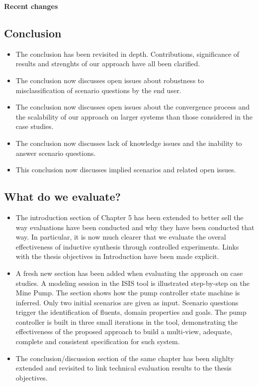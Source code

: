 \begin{center}
\textbf{\Large Recent changes}
\end{center}

\subsection*{Conclusion}

\begin{itemize}
\item The conclusion has been revisited in depth. Contributions, significance of 
      results and strenghts of our approach have all been clarified.
\item The conclusion now discusses open issues about robustness to
      misclassification of scenario questions by the end user.
\item The conclusion now discusses open issues about the convergence process and 
      the scalability of our approach on larger systems than those considered in
      the case studies.
\item The conclusion now discusses lack of knowledge issues and the inability to 
      answer scenario questions.
\item This conclusion now discusses implied scenarios and related open issues.
\end{itemize}

\subsection*{What do we evaluate?}

\begin{itemize}
\item The introduction section of Chapter 5 has been extended to better sell the 
    way evaluations have been conducted and why they have been conducted that 
    way. In particular, it is now much clearer that we evaluate the overal 
    effectiveness of inductive synthesis through controlled experiments. 
    Links with the thesis objectives in Introduction have been made explicit.
\item A fresh new section has been added when evaluating the approach on case 
    studies. A modeling session in the ISIS tool is illustrated step-by-step on
    the Mine Pump. The section shows how the pump controller state machine is 
    inferred. Only two initial scenarios are given as input. Scenario questions
    trigger the identification of fluents, domain properties and goals. The pump
    controller is built in three small iterations in the tool, demonstrating the
    effectiveness of the proposed approach to build a multi-view, adequate, 
    complete and consistent specification for such system.
\item The conclusion/discussion section of the same chapter has been slighlty 
    extended and revisited to link technical evaluation results to the thesis
    objectives.
\end{itemize}

